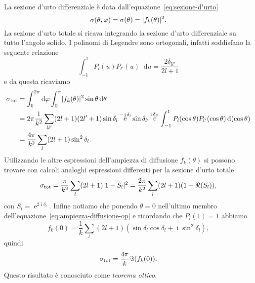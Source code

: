 \documentclass[a4paper,fleqn,twoside,12pt]{article}
\renewcommand{\phi}{\varphi}
\newcommand*{\dd}{\mathop{}\!\mathrm{d}} %
\DeclareMathOperator{\e}{\mathrm{e}} %
\DeclareMathOperator{\uimm}{\mathrm{i}} %
\DeclarePairedDelimiter{\abs}{\lvert}{\rvert}
\begin{document}
La sezione d'urto differenziale è data dall'equazione~\eqref{eq:sezione-d'urto}
\begin{equation}
  \sigma(\theta,\phi) = \sigma(\theta) = \abs{f_{k}(\theta)}^{2}.
\end{equation}
La sezione d'urto totale si ricava integrando la sezione d'urto differenziale su
tutto l'angolo solido.  I polinomi di Legendre sono ortogonali, infatti
soddisfano la seguente relazione
\begin{equation}
  \int_{-1}^{1}P_{l}(u)P_{l'}(u)\dd u = \frac{2\delta_{ll'}}{2l+1}
\end{equation}
e da questa ricaviamo
\begin{equation}
  \label{eq:serie-sfasamenti}
  \begin{split}
    \sigma_{\textup{tot}} &= \int_{0}^{2\pi}\dd \phi \int_{0}^{\pi}
    \abs{f_{k}(\theta)}^{2} \sin\theta \dd\theta \\
    &= 2\pi \frac{1}{k^{2}} \sum_{ll'}(2l+1)(2l'+1) \sin\delta_{l} \e^{-\uimm
      \delta_{l}} \sin\delta_{l'}\e^{\uimm \delta_{l'}}
    \int_{-1}^{1}P_{l}(\cos\theta)P_{l'}(\cos\theta) \dd(\cos\theta) \\
    &= \frac{4\pi}{k^{2}} \sum_{l}(2l+1)\sin^{2}\delta_{l}.
  \end{split}
\end{equation}
Utilizzando le altre espressioni dell'ampiezza di diffusione $f_{k}(\theta)$ si
possono trovare con calcoli analoghi espressioni differenti per la sezione
d'urto totale
\begin{equation}
  \sigma_{\textup{tot}} = \frac{\pi}{k^{2}} \sum_{l}(2l+1)\abs{1 - S_{l}}^{2} =
  \frac{2\pi}{k^{2}} \sum_{l}(2l+1)(1-\Re(S_{l})),
\end{equation}
con $S_{l} = \e^{2\uimm\delta_{l}}$.  Infine notiamo che ponendo $\theta = 0$
nell'ultimo membro dell'equazione~\eqref{eq:ampiezza-diffusione-op} e ricordando
che $P_{l}(1) = 1$ abbiamo
\begin{equation}
  f_{k}(0) = \frac{1}{k} \sum_{l}(2l+1)(\sin\delta_{l}\cos\delta_{l} + \uimm
  \sin^{2}\delta_{l}),
\end{equation}
quindi
\begin{equation}
  \sigma_{\textup{tot}} = \frac{4\pi}{k} \Im(f_{k}(0)).
\end{equation}
Questo risultato è conosciuto come \emph{teorema ottico}.
\end{document}
